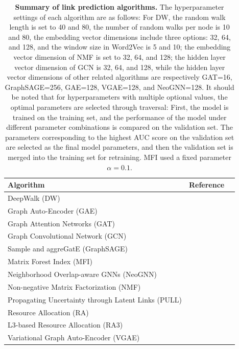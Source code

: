 \documentclass{article}
\begin{document}
\begin{table}[htbp]
	\centering
	\caption{\textbf{Summary of link prediction algorithms.} 
		The hyperparameter settings of each algorithm are as follows: For DW, the random walk length is set to 40 and 80, the number of random walks per node is 10 and 80, the embedding vector dimensions include three options: 32, 64, and 128, and the window size in Word2Vec is 5 and 10; the embedding vector dimension of NMF is set to 32, 64, and 128; the hidden layer vector dimension of GCN is 32, 64, and 128, while the hidden layer vector dimensions of other related algorithms are respectively GAT=16, GraphSAGE=256, GAE=128, VGAE=128, and NeoGNN=128. It should be noted that for hyperparameters with multiple optional values, the optimal parameters are selected through traversal: First, the model is trained on the training set, and the performance of the model under different parameter combinations is compared on the validation set. The parameters corresponding to the highest AUC score on the validation set are selected as the final model parameters, and then the validation set is merged into the training set for retraining. MFI used a fixed parameter $\alpha = 0.1$. }
	\label{tab:algorithms}
	\renewcommand{\arraystretch}{1.4}
	\begin{tabularx}{\textwidth}{@{}>{\RaggedRight}p{12cm}  >{\RaggedRight}X l@{}}
		\toprule
		\textbf{Algorithm} & \textbf{Reference} \\
		\midrule
		DeepWalk (DW) 
		& \cite{perozzi2014} \\
		
		Graph Auto-Encoder (GAE)
		& \cite{kipf2016} \\
		
		Graph Attention Networks (GAT)
		& \cite{velickovic2018} \\
		
		Graph Convolutional Network (GCN) 
		& \cite{chen2020a} \\
		
		Sample and aggreGatE (GraphSAGE)
		& \cite{hamilton2017} \\
		
		Matrix Forest Index (MFI) 
		& \cite{chebotarev1997} \\
		
		Neighborhood Overlap-aware GNNs (NeoGNN)
		& \cite{yun2021} \\
		
		Non-negative Matrix Factorization (NMF) 
		& \cite{chen2020b} \\
		
		Propagating Uncertainty through Latent Links (PULL)
		& \cite{kim2025} \\
		
		Resource Allocation (RA) 
		& \cite{ou2007, zhou2009} \\
		
		L3-based Resource Allocation (RA3) 
		& \cite{kovacs2019, pech2019} \\
		
		Variational Graph Auto-Encoder (VGAE)
		& \cite{kipf2016} \\
		
		\bottomrule
	\end{tabularx}
\end{table}
\end{document}
